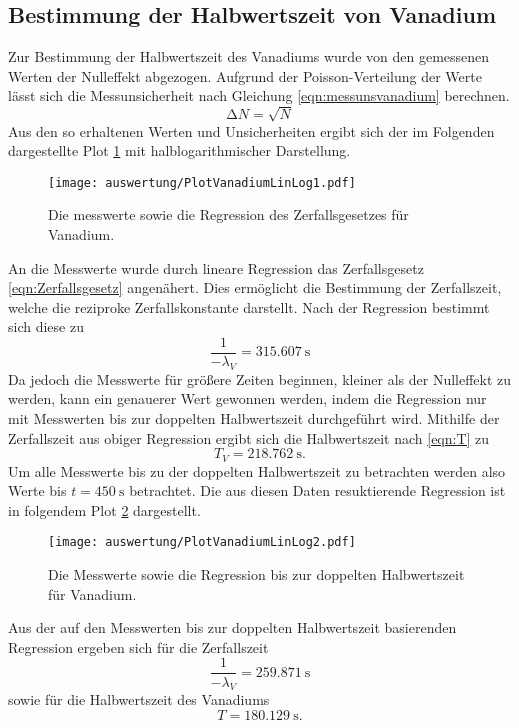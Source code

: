 \subsection{Bestimmung der Halbwertszeit von Vanadium}
  \label{sec:vanadium1}
  Zur Bestimmung der Halbwertszeit des Vanadiums wurde von den gemessenen Werten der Nulleffekt abgezogen. Aufgrund der Poisson-Verteilung der Werte lässt sich die Messunsicherheit nach
  Gleichung \eqref{eqn:messunsvanadium} berechnen.
  \begin{equation}
    \label{eqn:messunsvanadium}
    \increment N = \sqrt{N}
  \end{equation}
  Aus den so erhaltenen Werten und Unsicherheiten ergibt sich der im Folgenden dargestellte Plot \ref{fig:PlotVanadiumLinLog1} mit halblogarithmischer Darstellung.
  \begin{figure}[H]
    \centering
    \caption{Die messwerte sowie die Regression des Zerfallsgesetzes für Vanadium.}
    \label{fig:PlotVanadiumLinLog1}
    \texttt{[image: auswertung/PlotVanadiumLinLog1.pdf]}
  \end{figure}
  \noindent
  An die Messwerte wurde durch lineare Regression das Zerfallsgesetz \ref{eqn:Zerfallsgesetz} angenähert. Dies ermöglicht die Bestimmung der Zerfallszeit, welche die reziproke Zerfallskonstante
  darstellt. Nach der Regression bestimmt sich diese zu
  \begin{equation}
    \label{eqn:zerfallszeitergebniss1}
    \frac{1}{-\lambda_{V}} = \SI{315.607}{\second}
  \end{equation}
  Da jedoch die Messwerte für größere Zeiten beginnen, kleiner als der Nulleffekt zu werden, kann ein genauerer Wert gewonnen werden, indem die Regression nur mit Messwerten bis zur doppelten
  Halbwertszeit durchgeführt wird. Mithilfe der Zerfallszeit aus obiger Regression ergibt sich die Halbwertszeit nach \ref{eqn:T} zu
  \begin{equation}
    \label{eqn:halbwertszeitergebniss1}
    T_{V} = \SI{218.762}{\second}.
  \end{equation}
  Um alle Messwerte bis zu der doppelten Halbwertszeit zu betrachten werden also Werte bis $t = \SI{450}{\second}$ betrachtet. Die aus diesen Daten resuktierende Regression ist in folgendem
  Plot \ref{fig:PlotVanadiumLinLog2} dargestellt.
  \begin{figure}[H]
    \centering
    \caption{Die Messwerte sowie die Regression bis zur doppelten Halbwertszeit für Vanadium.}
    \label{fig:PlotVanadiumLinLog2}
    \texttt{[image: auswertung/PlotVanadiumLinLog2.pdf]}
  \end{figure}
  \noindent
  Aus der auf den Messwerten bis zur doppelten Halbwertszeit basierenden Regression ergeben sich für die Zerfallszeit
  \begin{equation}
    \label{eqn:zerfallszeitergebniss2}
    \frac{1}{-\lambda_{V}} = \SI{259.871}{\second}
  \end{equation}
  sowie für die Halbwertszeit des Vanadiums
  \begin{equation}
    \label{eqn:halbwertszeitergebniss2}
    T = \SI{180.129}{\second}.
  \end{equation}
